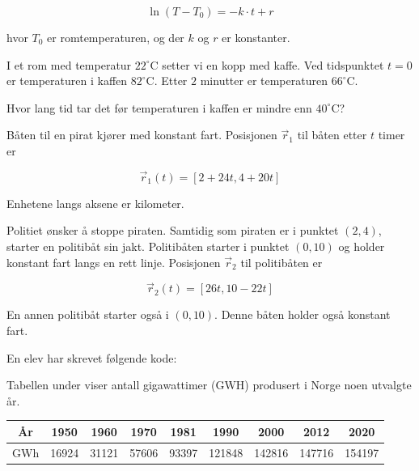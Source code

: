 \[
\ln(T - T_0) = -k \cdot t + r
\]

hvor $T_0$ er romtemperaturen, og der $k$ og $r$ er konstanter.

I et rom med temperatur $22^\circ\mathrm{C}$ setter vi en kopp
med kaffe. Ved tidspunktet $t = 0$ er temperaturen i kaffen
$82^\circ\mathrm{C}$. Etter $2$ minutter er temperaturen
$66^\circ\mathrm{C}$. \os

Hvor lang tid tar det før temperaturen i kaffen er mindre enn
$40^\circ\mathrm{C}$?

Båten til en pirat kjører med konstant fart. Posisjonen
$\vec{r}_1$ til båten etter $t$ timer er

\[
\vec{r}_1(t) = [2 + 24t, 4 + 20t]
\]

Enhetene langs aksene er kilometer.


Politiet ønsker å stoppe piraten. Samtidig som piraten er i
punktet $(2, 4)$, starter en politibåt sin jakt. Politibåten
starter i punktet $(0, 10)$ og holder konstant fart langs en
rett linje. Posisjonen $\vec{r}_2$ til politibåten er

\[
\vec{r}_2(t) = [26t, 10 - 22t]
\]


En annen politibåt starter også i $(0, 10)$. Denne båten
holder også konstant fart.


\newpage
{}
En elev har skrevet følgende kode:


Tabellen under viser antall gigawattimer (GWH) produsert i Norge noen utvalgte år. \vs
\begin{center}
	\small
	\begin{tabular}{|c|c|c|c|c|c|c|c|c|}
		\hline
		År & 1950 & 1960 & 1970 & 1981 & 1990 & 2000 & 2012 & 2020 \\
		\hline
		GWh & 16924 & 31121 & 57606 & 93397 & 121848 & 142816 & 147716 & 154197 \\
		\hline
	\end{tabular}
\end{center}

